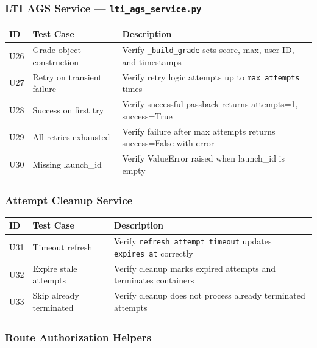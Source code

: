\documentclass[12pt, letterpaper]{article}
\begin{document}
\subsubsection{LTI AGS Service --- \texttt{lti\_ags\_service.py}}

\begin{longtable}{p{0.5cm} p{4.5cm} p{8.5cm}}
    \toprule
    \textbf{ID} & \textbf{Test Case} & \textbf{Description} \\
    \midrule
    U26 & Grade object construction & Verify \texttt{\_build\_grade} sets score, max, user ID, and timestamps \\
    U27 & Retry on transient failure & Verify retry logic attempts up to \texttt{max\_attempts} times \\
    U28 & Success on first try & Verify successful passback returns attempts=1, success=True \\
    U29 & All retries exhausted & Verify failure after max attempts returns success=False with error \\
    U30 & Missing launch\_id & Verify ValueError raised when launch\_id is empty \\
    \bottomrule
\end{longtable}

\subsubsection{Attempt Cleanup Service}

\begin{longtable}{p{0.5cm} p{4.5cm} p{8.5cm}}
    \toprule
    \textbf{ID} & \textbf{Test Case} & \textbf{Description} \\
    \midrule
    U31 & Timeout refresh & Verify \texttt{refresh\_attempt\_timeout} updates \texttt{expires\_at} correctly \\
    U32 & Expire stale attempts & Verify cleanup marks expired attempts and terminates containers \\
    U33 & Skip already terminated & Verify cleanup does not process already terminated attempts \\
    \bottomrule
\end{longtable}

\subsubsection{Route Authorization Helpers}
\end{document}

